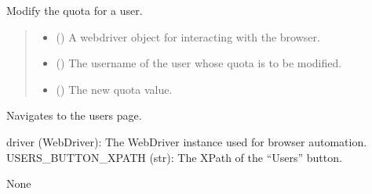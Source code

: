 \documentclass[letterpaper,10pt,english]{sphinxmanual}
\begin{document}
\begin{fulllineitems}
\label{\detokenize{utils:utils.user_management.modify_quota}}
\pysigstartsignatures
{}
\pysigstopsignatures
\sphinxAtStartPar
Modify the quota for a user.
\begin{quote}\begin{description}
\begin{itemize}
\item {} 
\sphinxAtStartPar
{} () \textendash{} A webdriver object for interacting with the browser.

\item {} 
\sphinxAtStartPar
{} () \textendash{} The username of the user whose quota is to be modified.

\item {} 
\sphinxAtStartPar
{} () \textendash{} The new quota value.

\end{itemize}

\end{description}\end{quote}

\end{fulllineitems}


\begin{fulllineitems}
\label{\detokenize{utils:utils.user_management.navigate_to_users_page}}
\pysigstartsignatures
{}
\pysigstopsignatures
\sphinxAtStartPar
Navigates to the users page.
\begin{description}
\sphinxAtStartPar
driver (WebDriver): The WebDriver instance used for browser automation.
USERS\_BUTTON\_XPATH (str): The XPath of the “Users” button.

\sphinxAtStartPar
None

\end{description}

\end{fulllineitems}
\end{document}

